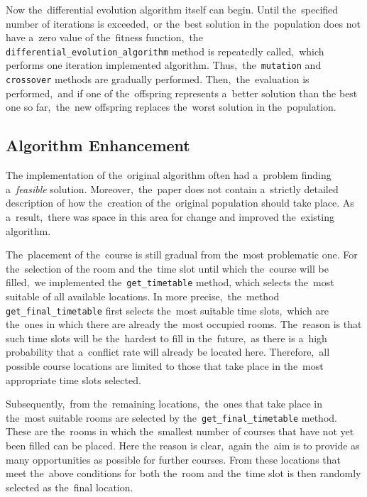 Now the~differential evolution algorithm itself can begin. 
Until the~specified number of iterations is exceeded,~or the~best solution in the~population does not have a~zero value of the~fitness function,~the \texttt{differe\-ntial\_evolution\_algorithm} method is repeatedly called,~which performs one iteration implemented algorithm.
Thus,~the~\texttt{mutation} and \texttt{crossover} methods are gradually performed. 
Then,~the~evaluation is performed,~and if one of the~offspring represents a~better solution than the best one so far,~the~new offspring replaces the~worst solution in the~population.

\subsection{Algorithm Enhancement}
The implementation of the~original algorithm often had a~problem finding a~\textit{feasible} solution.
Moreover,~the~paper does not contain a~strictly detailed description of how the~creation of the~original population should take place.
As a~result,~there was space in this area for change and improved the~existing algorithm.

The~placement of the~course is still gradual from the~most problematic one.
For the~selection of the room and the~time slot until which the~course will be filled,~we implemented the~\texttt{get\_timetable} method, which selects the~most suitable of all available locations.
In more precise,~the~method \texttt{get\_final\_ti\-metable} first selects the~most suitable time slots,~wh\-ich are the~ones in which there are already the~most occupied rooms.
The~reason is that such time slots will be the~hardest to fill in the~future,~as there is a~high probability that a~conflict rate will already be located here.
Therefore,~all possible course locations are limited to those that take place in the~most appropriate time slots selected.

Subsequently,~from the~remaining locations,~the~on\-es that take place in the~most suitable rooms are selected by the~\texttt{get\_final\_time\-table} method.
Th\-ese are the~rooms in which the~smallest number of courses that have not yet been filled can be placed. 
Here the reason is clear,~again the~aim is to provide as many opportunities as possible for further courses.
From these locations that meet the~above conditions for both the~room and the~time slot is then randomly selected as the~final location.

